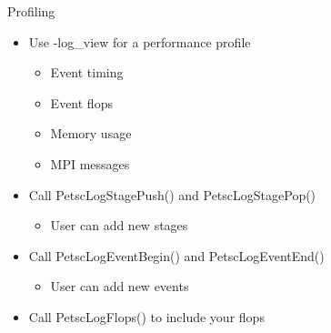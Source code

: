 \begin{frame}{Profiling}

\begin{itemize}
  \item Use {\kb -log\_view} for a performance profile
  \begin{itemize}
    \item Event timing
    \item Event flops
    \item Memory usage
    \item MPI messages
  \end{itemize}

  \item Call {\kb PetscLogStagePush()} and {\kb PetscLogStagePop()}
  \begin{itemize}
    \item User can add new stages
  \end{itemize}

  \item Call {\kb PetscLogEventBegin()} and {\kb PetscLogEventEnd()}
  \begin{itemize}
    \item User can add new events
  \end{itemize}

  \item Call {\kb PetscLogFlops()} to include your flops
\end{itemize}

\end{frame}
